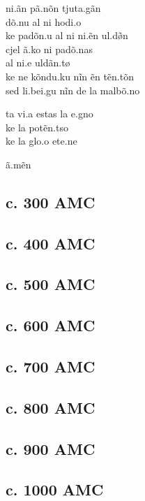 \begin{multicols*}{2}
\prstr ni.\paljfric ãn \prstr pã.nõn \scstr t\tiebar\esh ju\prstr ta.gãn\\
\prstr dõ.nu al ni ho\prstr di.\paljfric o\lgth{}\\
ke\lgth{} pa\alvrap\prstr dõn.u al ni \prstr ni.\paljfric ẽ\lgth{}n \prstr\esh ul.dø̃\lgth{}n\\
cjel \prstr ã\engma.ko\lgth{} ni pa\alvrap\prstr dõ.nas\\
al \prstr ni.\paljfric e\lgth{} \esh ul\prstr dãn.tø\lgth{}\\
ke\lgth{} ne kõn\prstr du.ku nĩn ẽn \prstr tẽn.tõn\\
sed \scstr li.be\prstr\alvrap i.gu nĩn de la mal\prstr bõ.no

t\tiebar\esh a\alvrap{} \prstr vi.\paljfric a e\prstr stas la \prstr \alvrap e.gno\\
ke\lgth{} la po\prstr tẽn.t\tiebar so\\
ke\lgth{} la \prstr glo.\alvrap o e\prstr te\alvrap.ne

\prstr ã.mẽn

\end{multicols*}

\subsection{c. 300 AMC}

\subsection{c. 400 AMC}

\subsection{c. 500 AMC}

\subsection{c. 600 AMC}

\subsection{c. 700 AMC}

\subsection{c. 800 AMC}

\subsection{c. 900 AMC}

\subsection{c. 1000 AMC}